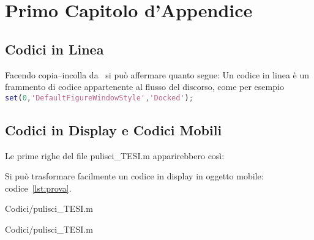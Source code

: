 %
%
\chapter{Primo Capitolo d'Appendice}
%
\label{cap:appendice1}
%
%
\lipsum[1]
%
\section{Codici in Linea}
Facendo copia--incolla da~\textcite{pantieri:2012:larte-di-scrivere-con-latex} si può affermare quanto segue: \omissis Un codice in linea è un frammento di codice appartenente al flusso del discorso, come per esempio \lstinline[language=Matlab]!set(0,'DefaultFigureWindowStyle','Docked');!\omissis
%
\section{Codici in Display e Codici Mobili}
%
\omissis Le prime righe del file pulisci\_TESI.m apparirebbero così:
%

%
Si può trasformare facilmente un codice in display in oggetto mobile: codice~\vref{lst:prova}.
%
\begin{lstinputlisting}[float=tb,
		lastline=8,
		language=Matlab,
		caption={prova},
		label=lst:prova]
		{Codici/pulisci_TESI.m}
\end{lstinputlisting}
%
\lipsum[1]
%
\begin{lstinputlisting}[%
		language=Matlab,
		caption={prova codice intero},
		label=lst:provaIntero]
		{Codici/pulisci_TESI.m}
\end{lstinputlisting}
%
\lipsum[1]
%
